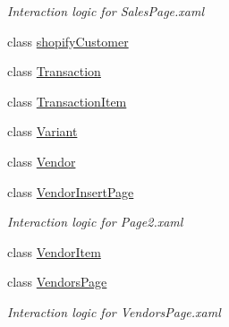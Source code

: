 \begin{DoxyCompactItemize}
\begin{DoxyCompactList}\small\item\em Interaction logic for Sales\+Page.\+xaml \end{DoxyCompactList}\item 
class \mbox{\hyperlink{class_nexus_1_1shopify_customer}{shopify\+Customer}}
\item 
class \mbox{\hyperlink{class_nexus_1_1_transaction}{Transaction}}
\item 
class \mbox{\hyperlink{class_nexus_1_1_transaction_item}{Transaction\+Item}}
\item 
class \mbox{\hyperlink{class_nexus_1_1_variant}{Variant}}
\item 
class \mbox{\hyperlink{class_nexus_1_1_vendor}{Vendor}}
\item 
class \mbox{\hyperlink{class_nexus_1_1_vendor_insert_page}{Vendor\+Insert\+Page}}
\begin{DoxyCompactList}\small\item\em Interaction logic for Page2.\+xaml \end{DoxyCompactList}\item 
class \mbox{\hyperlink{class_nexus_1_1_vendor_item}{Vendor\+Item}}
\item 
class \mbox{\hyperlink{class_nexus_1_1_vendors_page}{Vendors\+Page}}
\begin{DoxyCompactList}\small\item\em Interaction logic for Vendors\+Page.\+xaml \end{DoxyCompactList}\end{DoxyCompactItemize}
